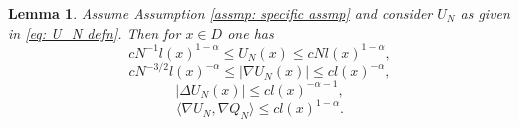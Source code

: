 \documentclass{article}
\newtheorem{lemma}{Lemma}
\begin{document}
\begin{lemma}\label{lem: bounds in terms of min}
    Assume Assumption \ref{assmp: specific assmp} and consider $U_N$ as given in \eqref{eq: U_N defn}.  Then for $x\in D$ one has
\begin{equation}\label{eq: bounds on U_N}
      cN^{-1}l(x)^{1-\alpha} \leq U_N(x)\leq cNl(x)^{1-\alpha},
    \end{equation}
    \begin{equation}\label{eq: bounds on nabla U_N}
      cN^{-3/2}l(x)^{-\alpha} \leq \lvert \nabla U_N(x)\rvert \leq  cl(x)^{-\alpha},
    \end{equation}
    \begin{equation}\label{eq: bounds on Delta U_N}
      \lvert \Delta U_N(x)\rvert \leq  cl(x)^{-\alpha-1},
    \end{equation}
    \begin{equation}
        \langle \nabla U_N, \nabla Q_N\rangle\leq cl(x)^{1-\alpha}.
    \end{equation}
\end{lemma}
\end{document}
